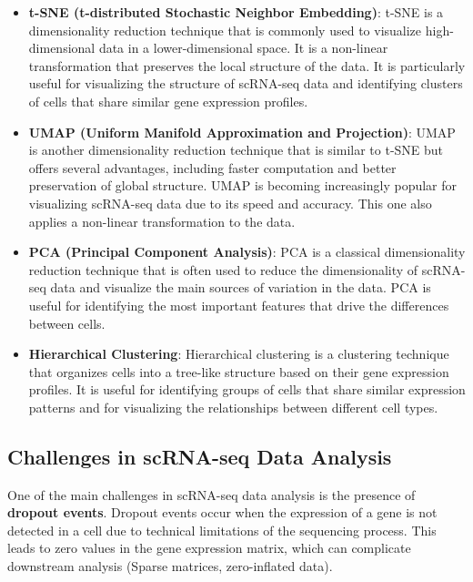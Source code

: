 \documentclass[a4paper]{article}
\begin{document}
\begin{itemize}
  \item \textbf{t-SNE (t-distributed Stochastic Neighbor Embedding)}: 
  t-SNE is a dimensionality reduction technique that is commonly used
  to visualize high-dimensional data in a lower-dimensional space. It 
  is a non-linear transformation that preserves the local structure
  of the data.
  It is particularly useful for visualizing the structure of scRNA-seq
  data and identifying clusters of cells that share similar gene expression
  profiles.

  \item \textbf{UMAP (Uniform Manifold Approximation and Projection)}: 
  UMAP is another dimensionality reduction technique that is similar to
  t-SNE but offers several advantages, including faster computation
  and better preservation of global structure. UMAP is becoming increasingly
  popular for visualizing scRNA-seq data due to its speed and accuracy.
  This one also applies a non-linear transformation to the data.

  \item \textbf{PCA (Principal Component Analysis)}: PCA is a classical
  dimensionality reduction technique that is often used to reduce the
  dimensionality of scRNA-seq data and visualize the main sources of
  variation in the data. PCA is useful for identifying the most important
  features that drive the differences between cells.

  \item \textbf{Hierarchical Clustering}: Hierarchical clustering is a
  clustering technique that organizes cells into a tree-like structure
  based on their gene expression profiles. It is useful for identifying
  groups of cells that share similar expression patterns and for visualizing
  the relationships between different cell types.

\end{itemize}

\subsection*{Challenges in scRNA-seq Data Analysis}

One of the main challenges in scRNA-seq data analysis is the presence 
of \textbf{dropout events}. Dropout events occur when the expression of a gene
is not detected in a cell due to technical limitations of the sequencing
process. This leads to zero values in the gene expression matrix, which
can complicate downstream analysis (Sparse matrices, zero-inflated data).
\end{document}
